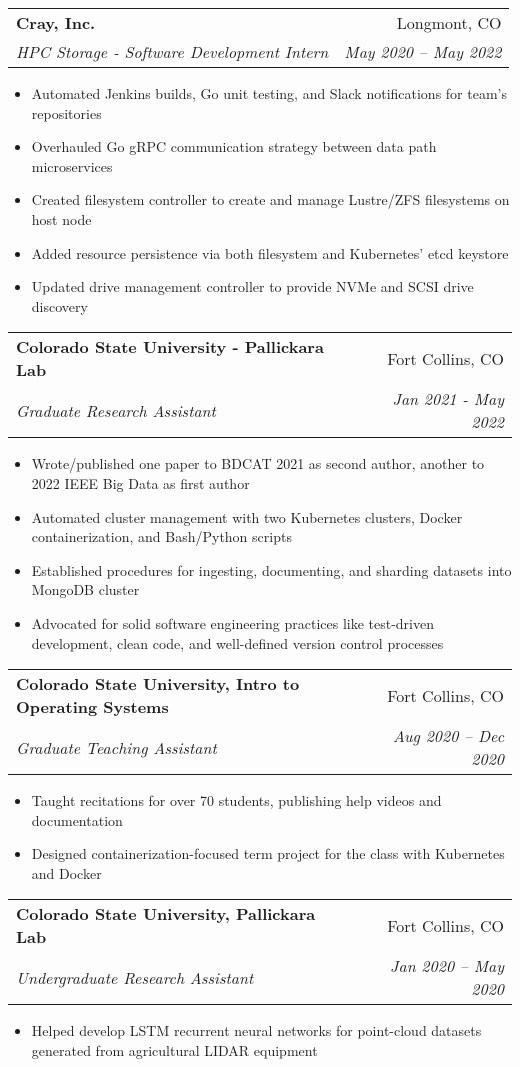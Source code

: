 \documentclass[letterpaper,11pt]{article}
\makeatletter
\newcommand{\resumeItem}[2]{
  \item\small{
    \textbf{#1}{#2 \vspace{-2pt}}
  }
}
\newcommand{\resumeSubheading}[4]{
  \vspace{-1pt}\item
    \begin{tabular*}{0.97\textwidth}[t]{l@{\extracolsep{\fill}}r}
      \textbf{#1} & #2 \\
      \textit{\small#3} & \textit{\small #4} \\
    \end{tabular*}\vspace{-5pt}
}
\newcommand{\resumeSubSubheading}[2]{
    \begin{tabular*}{0.97\textwidth}{l@{\extracolsep{\fill}}r}
      \textit{\small#1} & \textit{\small #2} \\
    \end{tabular*}\vspace{-5pt}
}
\newcommand{\resumeItemListStart}{\begin{itemize}}
\newcommand{\resumeItemListEnd}{\end{itemize}\vspace{-5pt}}
\makeatother
\begin{document}

    \resumeSubheading
      {Cray, Inc.}{Longmont, CO}
      {HPC Storage - Software Development Intern}{May 2020 -- May 2022}
      \resumeItemListStart
        \resumeItem{}
          {Automated Jenkins builds, Go unit testing, and Slack notifications for team's repositories}
        \resumeItem{}
          {Overhauled Go gRPC communication strategy between data path microservices}
        \resumeItem{}
          {Created filesystem controller to create and manage Lustre/ZFS filesystems on host node}
        \resumeItem{}
          {Added resource persistence via both filesystem and Kubernetes' etcd keystore}
        \resumeItem{}
          {Updated drive management controller to provide NVMe and SCSI drive discovery}
      \resumeItemListEnd

    \resumeSubheading
      {Colorado State University - Pallickara Lab}{Fort Collins, CO}
      {Graduate Research Assistant}{Jan 2021 - May 2022}
      \resumeItemListStart
        \resumeItem{}
          {Wrote/published one paper to BDCAT 2021 as second author, another to 2022 IEEE Big Data as first author}
        \resumeItem{}
          {Automated cluster management with two Kubernetes clusters, Docker containerization, and Bash/Python scripts}
        \resumeItem{}
          {Established procedures for ingesting, documenting, and sharding datasets into MongoDB cluster}
        \resumeItem{}
          {Advocated for solid software engineering practices like test-driven development, clean code, and well-defined version control processes}
      \resumeItemListEnd

    \resumeSubheading
      {Colorado State University, Intro to Operating Systems}{Fort Collins, CO}
      {Graduate Teaching Assistant}{Aug 2020 -- Dec 2020}
      \resumeItemListStart
        \resumeItem{}
          {Taught recitations for over 70 students, publishing help videos and documentation}
        \resumeItem{}
          {Designed containerization-focused term project for the class with Kubernetes and Docker}
      \resumeItemListEnd


    \resumeSubheading
      {Colorado State University, Pallickara Lab}{Fort Collins, CO}
      {Undergraduate Research Assistant}{Jan 2020 -- May 2020}
      \resumeItemListStart
        \resumeItem{}
          {Helped develop LSTM recurrent neural networks for point-cloud datasets generated from agricultural LIDAR equipment}
      \resumeItemListEnd
\end{document}

